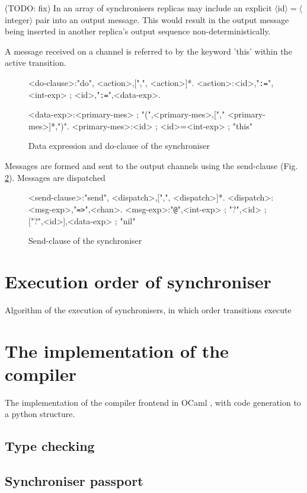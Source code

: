 (TODO: fix) In an array of synchronisers replicas may include an explicit $\langle$id$\rangle$$=$$\langle$integer$\rangle$ pair into an output message. This would result in the output message being inserted in another replica's output sequence non-deterministically.

A message received on a channel is referred to by the keyword 'this' within the active transition.

\begin{figure}[h!]
\small
\begin{grammar}
<do-clause>:"do", <action>,[",", <action>]*.
<action>:<id>,"{\tt :=}",<int-exp> ; <id>,"{\tt :=}",<data-exp>.

<data-exp>:<primary-mes> ; "(",<primary-mes>,["," <primary-mes>]*,")".
<primary-mes>:<id> ; <id>=<int-exp> ; "this"
\end{grammar}
\caption{Data expression and do-clause of the synchroniser}
\label{sync_syntax:do}
\end{figure}

Messages are formed and sent to the output channels using the send-clause (Fig. \ref{sync_syntax:send}). Messages are dispatched 

\begin{figure}[h!]
\small
\begin{grammar}
<send-clause>:"send", <dispatch>,[",", <dispatch>]*.
<dispatch>:<msg-exp>,"{\tt =>}",<chan>.
<msg-exp>:"{\tt @}",<int-exp> ; "?",<id> ; ["?",<id>],<data-exp> ; "nil"
\end{grammar}
\caption{Send-clause of the synchroniser}
\label{sync_syntax:send}
\end{figure}


\section{Execution order of synchroniser\label{execod}}
Algorithm of the execution of synchronisers, in which order transitions execute


\section{The implementation of the compiler}
The implementation of the compiler frontend in OCaml \cite{realworldocaml}, with code generation to a python structure.

  \subsection{Type checking}
  \subsection{Synchroniser passport}
